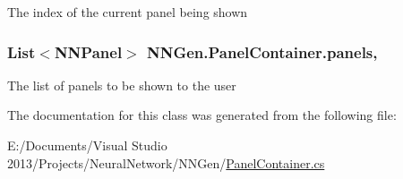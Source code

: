 The index of the current panel being shown 

\hypertarget{class_n_n_gen_1_1_panel_container_a31f3e003f5a5fa87884d717e2c01f310}{}
\subsubsection[{panels}]{\setlength{\rightskip}{0pt plus 5cm}List$<${\bf N\+N\+Panel}$>$ N\+N\+Gen.\+Panel\+Container.\+panels\hspace{0.3cm}{\ttfamily [get]}, {\ttfamily [set]}}\label{class_n_n_gen_1_1_panel_container_a31f3e003f5a5fa87884d717e2c01f310}


The list of panels to be shown to the user 



The documentation for this class was generated from the following file\+:\begin{DoxyCompactItemize}
\item 
E\+:/\+Documents/\+Visual Studio 2013/\+Projects/\+Neural\+Network/\+N\+N\+Gen/\hyperlink{_panel_container_8cs}{Panel\+Container.\+cs}\end{DoxyCompactItemize}
